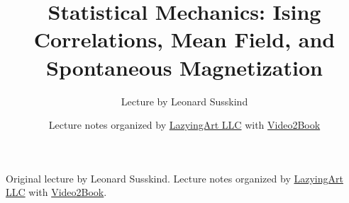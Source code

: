 \documentclass[11pt,oneside]{book}
\begin{document}
\frontmatter
\hypersetup{pageanchor=false}
\title{Statistical Mechanics: Ising Correlations, Mean Field, and Spontaneous Magnetization}
\author{Lecture by Leonard Susskind}
\date{Lecture notes organized by \href{https://lazying.art}{LazyingArt LLC} with \href{https://github.com/lachlanchen/Video2Book}{Video2Book}}
\maketitle
\begin{center}
\small Original lecture by Leonard Susskind. Lecture notes organized by \href{https://lazying.art}{LazyingArt LLC} with \href{https://github.com/lachlanchen/Video2Book}{Video2Book}.
\end{center}
\clearpage
\hypersetup{pageanchor=true}
\mainmatter

\end{document}

